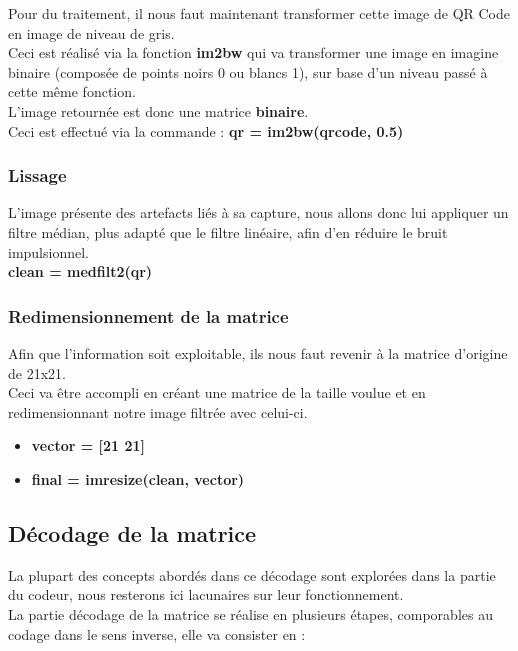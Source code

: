 \documentclass{report}
\begin{document}
				Pour du traitement, il nous faut maintenant transformer cette image de QR Code en image de niveau de gris.\\

				Ceci est réalisé via la fonction \textbf{im2bw} qui va transformer une image en imagine binaire (composée de points noirs 0 ou blancs 1), sur base d'un niveau passé à cette même fonction.\\
				L'image retournée est donc une matrice \textbf{binaire}.\\

				Ceci est effectué via la commande : \textbf{qr = im2bw(qrcode, 0.5)}

			\subsubsection{Lissage}

				L'image présente des artefacts liés à sa capture, nous allons donc lui appliquer un filtre médian, plus adapté que le filtre linéaire, afin d'en réduire le bruit impulsionnel.\\

				\textbf{clean = medfilt2(qr)}

			\subsubsection{Redimensionnement de la matrice}

				Afin que l'information soit exploitable, ils nous faut revenir à la matrice d'origine de 21x21.\\
				Ceci va être accompli en créant une matrice de la taille voulue et en redimensionnant notre image filtrée avec celui-ci.\\

				\begin{itemize}
					\item \textbf{vector = [21 21]}
					\item \textbf{final = imresize(clean, vector)}
				\end{itemize}


		\subsection{Décodage de la matrice}

			La plupart des concepts abordés dans ce décodage sont explorées dans la partie du codeur, nous resterons ici lacunaires sur leur fonctionnement.\\
			La partie décodage de la matrice se réalise en plusieurs étapes, comporables au codage dans le sens inverse, elle va consister en : \\
\end{document}
